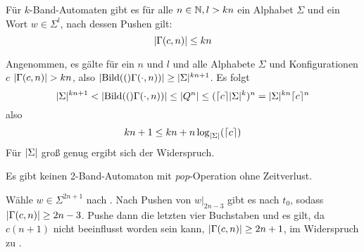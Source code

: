 \documentclass{article}
\begin{document}
\begin{satz}
    \label{cor:spacesize}
    Für $k$-Band-Automaten gibt es für alle $n \in \mathbb{N}, l > kn$ ein Alphabet $\Sigma$ und ein Wort $w \in \Sigma^l$, nach dessen Pushen gilt:
    \[ \lvert\Gamma(c,n)\rvert \leq kn \]
    \begin{beweis}
        Angenommen, es gälte für ein $n$ und $l$ und alle Alphabete $\Sigma$ und Konfigurationen $c$ $\lvert\Gamma(c,n)\rvert > kn$, also $\lvert\text{Bild}(()\Gamma(\cdot,n))\rvert \geq \lvert\Sigma\rvert^{kn+1}$.
        Es folgt
        \[ \lvert\Sigma\rvert^{kn+1} < \lvert\text{Bild}(()\Gamma(\cdot,n))\rvert \leq \lvert Q^n\rvert \leq (\lceil c\rceil\lvert\Sigma\rvert^k)^n = \lvert\Sigma\rvert^{kn} \lceil c\rceil^n \]
        also
        \[ kn + 1 \leq kn + n \log_{\lvert\Sigma\rvert}(\lceil c\rceil) \]
        Für $\lvert\Sigma\rvert$ groß genug ergibt sich der Widerspruch.
    \end{beweis}
\end{satz}

\begin{satz}
    Es gibt keinen 2-Band-Automaton mit \emph{pop}-Operation ohne Zeitverlust.
    \begin{beweis}
        Wähle $w \in \Sigma^{2n+1}$ nach . Nach Pushen von $w \big|_{2n-3}$ gibt es nach  $t_0$, sodass $\lvert\Gamma(c,n)\rvert \geq 2n-3$. Pushe dann die letzten vier Buchstaben und es gilt, da $c(n+1)$ nicht beeinflusst worden sein kann, $\lvert\Gamma(c,n)\rvert \geq 2n+1$, im Widerspruch zu .
    \end{beweis}
\end{satz}
\end{document}
